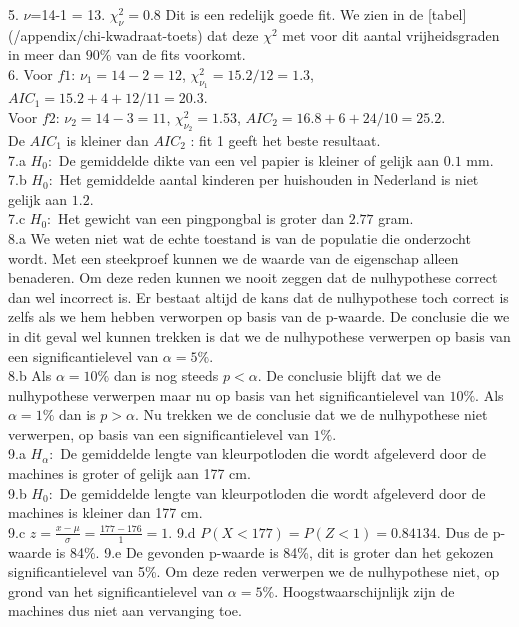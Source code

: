 5. $\nu$=14-1 = 13. $\chi^2_\nu = 0.8$ Dit is een redelijk goede fit. We zien in de [tabel](/appendix/chi-kwadraat-toets) dat deze $\chi^2$ met voor dit aantal vrijheidsgraden in meer dan $90\%$ van de fits voorkomt.\\


6. Voor $f1$: $\nu_1 = 14-2 = 12$, $\chi^2_{\nu_1} = 15.2/12 = 1.3$, $AIC_1 = 15.2 + 4 + 12/11 = 20.3$.\\
Voor $f2$: $\nu_2 = 14 -3 = 11$, $\chi^2_{\nu_2} = 1.53 $, $AIC_2 = 16.8 + 6 + 24/10 = 25.2$.\\
De $AIC_1$ is kleiner dan $AIC_2$ : fit 1 geeft het beste resultaat.\\


7.a $H_0:$ De gemiddelde dikte van een vel papier is kleiner of gelijk aan $0.1$ mm.\\
7.b $H_0:$ Het gemiddelde aantal kinderen per huishouden in Nederland is niet gelijk aan $1.2$.\\
7.c  $H_0:$ Het gewicht van een pingpongbal is groter dan $2.77$ gram.\\


8.a We weten niet wat de echte toestand is van de populatie die onderzocht wordt. Met een steekproef kunnen we de waarde van de eigenschap alleen benaderen. Om deze reden kunnen we nooit zeggen dat de nulhypothese correct dan wel incorrect is. Er bestaat altijd de kans dat de nulhypothese toch correct is zelfs als we hem hebben verworpen op basis van de p-waarde. De conclusie die we in dit geval wel kunnen trekken is dat we de nulhypothese verwerpen op basis van een significantielevel van $\alpha=5\%$.\\
8.b Als $\alpha=10\%$ dan is nog steeds $p<\alpha$. De conclusie blijft dat we de nulhypothese verwerpen maar nu op basis van het significantielevel van $10\%$. Als $\alpha=1\%$ dan is $p>\alpha$. Nu trekken we de conclusie dat we de nulhypothese niet verwerpen, op basis van een significantielevel van $1\%$.\\


9.a $H_{\alpha}:$ De gemiddelde lengte van kleurpotloden die wordt afgeleverd door de machines is groter of gelijk aan 177 cm.\\
9.b $H_{0}:$ De gemiddelde lengte van kleurpotloden die wordt afgeleverd door de machines is kleiner dan 177 cm.\\
9.c $z=\frac{x-\mu}{\sigma} = \frac{177-176}{1} = 1$.
9.d $P(X< 177) = P(Z< 1) = 0.84134$. Dus de p-waarde is 84\%.
9.e De gevonden p-waarde is 84\%, dit is groter dan het gekozen significantielevel van 5\%. Om deze reden verwerpen we de nulhypothese niet, op grond van het significantielevel van $\alpha=5\%$. Hoogstwaarschijnlijk zijn de machines dus niet aan vervanging toe.\\


